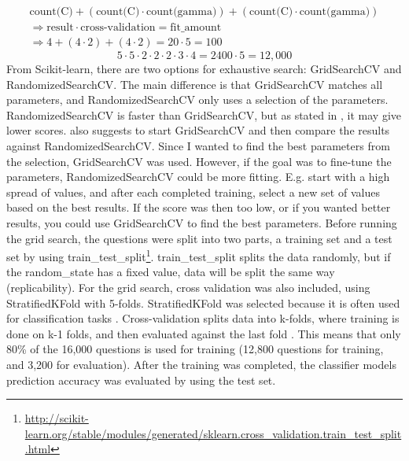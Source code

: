 \begin{equation}\label{eq:fit_svc}
\begin{split}
\text{count(C)} + (\text{count(C)} \cdot \text{count(gamma)}) + (\text{count(C)} \cdot \text{count(gamma)}) \\
\Longrightarrow  \text{result} \cdot \text{cross-validation} = \text{fit\_amount} \\
\Longrightarrow  4 + (4 \cdot 2) + (4 \cdot 2) = 20 \cdot 5 = 100 
\end{split}
\end{equation}
\begin{equation}\label{eq:fit_sgd}
 5 \cdot 5 \cdot 2 \cdot 2 \cdot 2 \cdot 3 \cdot 4 = 2400 \cdot 5 = 12,000
\end{equation}
From Scikit-learn, there are two options for exhaustive search: GridSearchCV and RandomizedSearchCV.
The main difference is that GridSearchCV matches all parameters, and RandomizedSearchCV only uses a selection of the parameters. 
RandomizedSearchCV is faster than GridSearchCV, but as stated in \cite{Markham2015a}, it may give lower scores.
\textcite{Markham2015a} also suggests to start GridSearchCV and then compare the results against RandomizedSearchCV.
Since I wanted to find the best parameters from the selection, GridSearchCV was used. 
However, if the goal was to fine-tune the parameters, RandomizedSearchCV could be more fitting. 
E.g. start with a high spread of values, and after each completed training, select a new set of values based on the best results. 
If the score was then too low, or if you wanted better results, you could use GridSearchCV to find the best parameters.
\vspace{0.5em}\newline
Before running the grid search, the questions were split into two parts, a training set and a test set by using 
 train\_test\_split\footnote{\url{http://scikit-learn.org/stable/modules/generated/sklearn.cross_validation.train_test_split.html}}.
train\_test\_split splits the data randomly, but if the random\_state has a fixed value, data will be split the same way (replicability).
For the grid search, cross validation was also included, using StratifiedKFold with 5-folds.
StratifiedKFold was selected because it is often used for classification tasks \cite{Kononenko2007}.
Cross-validation splits data into k-folds, where training is done on k-1 folds, and then evaluated against the last fold \cite{Bishop2006}.
This means that only 80\% of the 16,000 questions is used for training (12,800 questions for training, and 3,200 for evaluation).
After the training was completed, the classifier models prediction accuracy was evaluated by using the test set.
